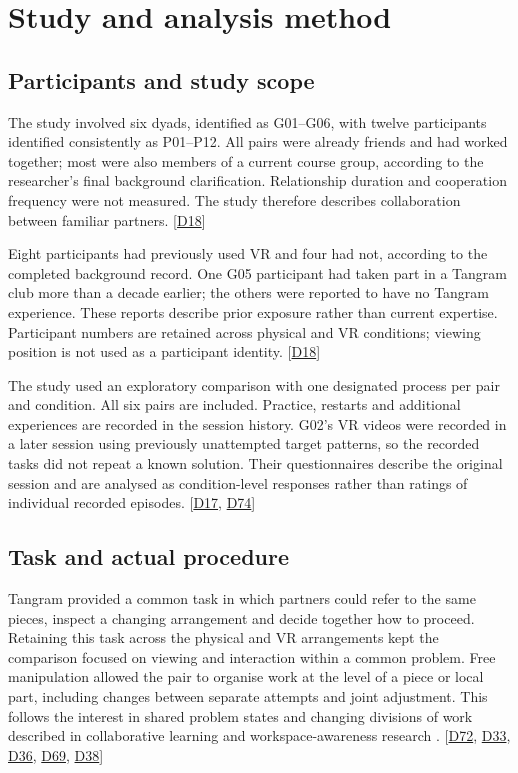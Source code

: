 \chapter{Study and analysis method}\label{chap:4}

\section{Participants and study scope}\label{sec:4-1}

The study involved six dyads, identified as G01--G06, with twelve participants identified consistently as P01--P12. All pairs were already friends and had worked together; most were also members of a current course group, according to the researcher's final background clarification. Relationship duration and cooperation frequency were not measured. The study therefore describes collaboration between familiar partners. [\hyperlink{src:D18}{D18}]

Eight participants had previously used VR and four had not, according to the completed background record. One G05 participant had taken part in a Tangram club more than a decade earlier; the others were reported to have no Tangram experience. These reports describe prior exposure rather than current expertise. Participant numbers are retained across physical and VR conditions; viewing position is not used as a participant identity. [\hyperlink{src:D18}{D18}]

The study used an exploratory comparison with one designated process per pair and condition. All six pairs are included. Practice, restarts and additional experiences are recorded in the session history. G02's VR videos were recorded in a later session using previously unattempted target patterns, so the recorded tasks did not repeat a known solution. Their questionnaires describe the original session and are analysed as condition-level responses rather than ratings of individual recorded episodes. [\hyperlink{src:D17}{D17}, \hyperlink{src:D74}{D74}]


\section{Task and actual procedure}\label{sec:4-2}

Tangram provided a common task in which partners could refer to the same pieces, inspect a changing arrangement and decide together how to proceed. Retaining this task across the physical and VR arrangements kept the comparison focused on viewing and interaction within a common problem. Free manipulation allowed the pair to organise work at the level of a piece or local part, including changes between separate attempts and joint adjustment. This follows the interest in shared problem states and changing divisions of work described in collaborative learning and workspace-awareness research \cite{roschelle1995,dillenbourg1999,gutwin2002}. [\hyperlink{src:D72}{D72}, \hyperlink{src:D33}{D33}, \hyperlink{src:D36}{D36}, \hyperlink{src:D69}{D69}, \hyperlink{src:D38}{D38}]

